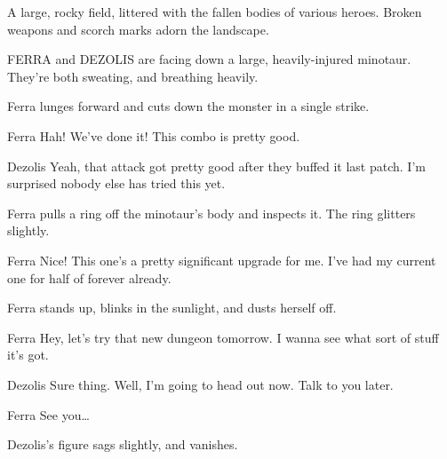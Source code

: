 



A large, rocky field, littered with the fallen bodies of various heroes.
Broken weapons and scorch marks adorn the landscape.

FERRA and DEZOLIS are facing down a large, heavily-injured minotaur.
They're both sweating, and breathing heavily.

Ferra lunges forward and cuts down the monster in a single strike.

\begin{dialogue}{Ferra}
Hah! We've done it! This combo is pretty good.
\end{dialogue}

\begin{dialogue}{Dezolis}
Yeah, that attack got pretty good after they buffed it last patch.
I'm surprised nobody else has tried this yet.
\end{dialogue}

Ferra pulls a ring off the minotaur's body and inspects it.
The ring glitters slightly.

\begin{dialogue}{Ferra}
Nice!
This one's a pretty significant upgrade for me.
I've had my current one for half of forever already.
\end{dialogue}

Ferra stands up, blinks in the sunlight, and dusts herself off.

\begin{dialogue}{Ferra}
Hey, let's try that new dungeon tomorrow.
I wanna see what sort of stuff it's got.
\end{dialogue}

\begin{dialogue}{Dezolis}
Sure thing.
Well, I'm going to head out now.
Talk to you later.
\end{dialogue}

\begin{dialogue}{Ferra}
See you\ldots
\end{dialogue}

Dezolis's figure sags slightly, and vanishes.


